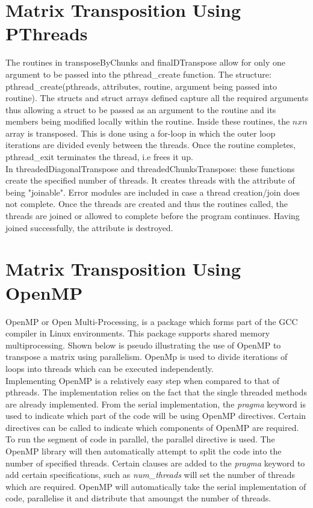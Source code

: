 \documentclass[a4paper, 11pt, onecolumn, conference]{IEEEtran}      %
\begin{document}
\section{Matrix Transposition Using PThreads}

The routines in transposeByChunks and finalDTranspose allow for only one argument to be passed into the pthread\_create function. The structure: pthread\_create(pthreads, attributes, routine, argument being passed into routine). The structs and struct arrays defined capture all the required arguments thus allowing a struct to be passed as an argument to the routine and its members being modified locally within the routine. Inside these routines, the $nxn$ array is transposed. This is done using a for-loop in which the outer loop iterations are divided evenly between the threads. Once the routine completes, pthread\_exit terminates the thread, i.e frees it up.\\

In threadedDiagonalTranspose and threadedChunksTranspose: these functions create the specified number of threads. It creates threads with the attribute of being "joinable". Error modules are included in case a thread creation/join does not complete. Once the threads are created and thus the routines called, the threads are joined or allowed to complete before the program continues. Having joined successfully, the attribute is destroyed. 

\section{Matrix Transposition Using OpenMP}

OpenMP or Open Multi-Processing, is a package which forms part of the GCC compiler in Linux environments. This package supports shared memory multiprocessing\cite{utexas_getting_nodate}. Shown below is pseudo illustrating the use of OpenMP to transpose a matrix using parallelism. OpenMp is used to divide iterations of loops into threads which can be executed independently.\\

Implementing OpenMP is a relatively easy step when compared to that of pthreads. The implementation relies on the fact that the single threaded methods are already implemented. From the serial implementation, the \textit{pragma} keyword is used to indicate which part of the code will be using OpenMP directives\cite{utexas_getting_nodate}.  Certain directives can be called to indicate which components of OpenMP are required. To run the segment of code in parallel, the parallel directive is used. The OpenMP library will then automatically attempt to split the code into the number of specified threads\cite{utexas_getting_nodate}. Certain clauses are added to the \textit{pragma} keyword to add certain specifications, such as \textit{num\_threads} will set the number of threads which are required\cite{utexas_getting_nodate}. OpenMP will automatically take the serial implementation of code, parallelise it and distribute that amoungst the number of threads\cite{utexas_getting_nodate}.\\
\end{document}
